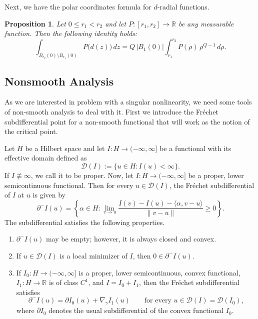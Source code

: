 \documentclass[11pt]{article}
\newtheorem{proposition}{Proposition}[section]
\newcommand{\gradgr}{\nabla_{\gamma}}
\begin{document}
Next, we have the polar coordinates formula for $d$-radial functions. 
\begin{proposition}
Let $0 \le r_1 < r_2$ and let $P : [r_1, r_2] \to \mathbb{R}$ be any measurable function. Then the following identity holds:
\begin{equation*}
\int_{B_{r_2}(0) \setminus B_{r_1}(0)} P\big(d(z)\big)\, dz
=
Q \, |B_1(0)| \int_{r_1}^{r_2} P(\rho)\, \rho^{Q - 1}\, d\rho .
\end{equation*}   
\end{proposition}


\subsection{Nonsmooth Analysis}
As we are interested in problem with a singular nonlinearity, we need some tools of non-smooth analysis to deal with it. First we introduce the Fr\'{e}chet subdifferential point for a non-smooth functional that will work as the notion of the critical point.  

Let $H$ be a Hilbert space and let $I : H \to (-\infty, \infty]$ be a functional with its effective domain defined as 
\[
\mathcal{D}(I) := \{ u \in H : I(u) < \infty \}.
\]
If $I \not\equiv \infty$, we call it to be proper. Now, let $I : H \to (-\infty, \infty]$ be a proper, lower semicontinuous functional.
Then for every $u \in \mathcal{D}(I)$, the Fr\'{e}chet subdifferential of $I$ at $u$ is given by
\begin{equation*}
\partial^{-} I(u)
=
\left\{
\alpha \in H :
\lim_{v \to u}
\frac{ I(v) - I(u) - \langle \alpha, v - u \rangle }
{\|v - u\|}
\ge 0
\right\}.
\end{equation*}
The subdifferential satisfies the following properties. 
\begin{enumerate}
    \item $\partial^{-} I(u)$ may be empty; however, it is always closed and convex.
    \item If $u \in \mathcal{D}(I)$ is a local minimizer of $I$, then $0 \in \partial^{-} I(u)$.
    \item If $I_0 : H \to (-\infty, \infty]$ is a proper, lower semicontinuous, convex functional, $I_1 : H \to \mathbb{R}$ is of class $C^1$, and $I = I_0 + I_1$, then the Fréchet subdifferential satisfies
\begin{equation*}
\partial^{-} I(u)
=
\partial I_0(u) + \gradgr I_1(u)
\qquad
\text{for every } u \in \mathcal{D}(I) = \mathcal{D}(I_0),
\end{equation*}
where $\partial I_0$ denotes the usual subdifferential of the convex functional
$I_0$.
\end{enumerate}
\end{document}
